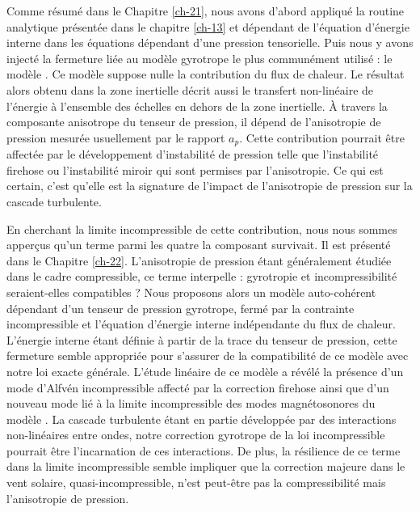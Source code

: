 Comme résumé dans le Chapitre \ref{ch-21}, nous avons d'abord appliqué la routine analytique présentée dans le chapitre \ref{ch-13} et dépendant de l'équation d'énergie interne dans les équations dépendant d'une pression tensorielle. Puis nous y avons injecté la fermeture liée au modèle gyrotrope le plus communément utilisé : le modèle . Ce modèle suppose nulle la contribution du flux de chaleur. Le résultat alors obtenu dans la zone inertielle décrit aussi le transfert non-linéaire de l'énergie à l'ensemble des échelles  en dehors de la zone inertielle. À travers la composante anisotrope du tenseur de pression, il dépend de l'anisotropie de pression mesurée usuellement par le rapport $a_p$. Cette contribution pourrait être affectée par le développement d'instabilité de pression telle que l'instabilité firehose ou l'instabilité miroir qui sont permises par l'anisotropie. Ce qui est certain, c'est qu'elle est la signature de l'impact de l'anisotropie de pression sur la cascade turbulente. 

En cherchant la limite incompressible de cette contribution, nous nous sommes apperçus qu'un terme parmi les quatre la composant survivait. Il est présenté dans le Chapitre \ref{ch-22}. L'anisotropie de pression étant généralement étudiée dans le cadre compressible, ce terme interpelle : gyrotropie et incompressibilité seraient-elles compatibles ? Nous proposons alors un modèle auto-cohérent dépendant d'un tenseur de pression gyrotrope, fermé par la contrainte incompressible et l'équation d'énergie interne indépendante du flux de chaleur. L'énergie interne étant définie à partir de la trace du tenseur de pression, cette fermeture semble appropriée pour s'assurer de la compatibilité de ce modèle avec notre loi exacte générale. L'étude linéaire de ce modèle a révélé la présence d'un mode d'Alfvén incompressible affecté par la correction firehose ainsi que d'un nouveau mode lié à la limite incompressible des modes magnétosonores du modèle . La cascade turbulente étant en partie développée par des interactions non-linéaires entre ondes, notre correction gyrotrope de la loi  incompressible pourrait être l'incarnation de ces interactions. De plus, la résilience de ce terme dans la limite incompressible semble impliquer que la correction majeure dans le vent solaire, quasi-incompressible, n'est peut-être pas la compressibilité mais l'anisotropie de pression. 

